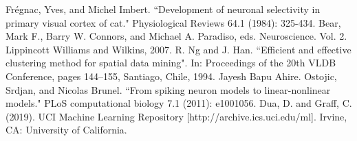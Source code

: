 \documentclass[10pt,twoside]{article}
\begin{document}
\begin{block}
\begin{thebibliography}
Frégnac, Yves, and Michel Imbert. ``Development of neuronal selectivity in primary visual cortex of cat." Physiological Reviews 64.1 (1984): 325-434.
Bear, Mark F., Barry W. Connors, and Michael A. Paradiso, eds. Neuroscience. Vol. 2. Lippincott Williams and Wilkins, 2007.
R. Ng and J. Han. ``Efficient and effective clustering method for spatial data mining". In: Proceedings of the 20th VLDB Conference, pages 144–155, Santiago, Chile, 1994.
Jayesh Bapu Ahire. Ostojic, Srdjan, and Nicolas Brunel. ``From spiking neuron models to linear-nonlinear models." PLoS computational biology 7.1 (2011): e1001056.
Dua, D. and Graff, C. (2019). UCI Machine Learning Repository [http://archive.ics.uci.edu/ml]. Irvine, CA: University of California.
\end{thebibliography}
\end{block}
\end{document}
